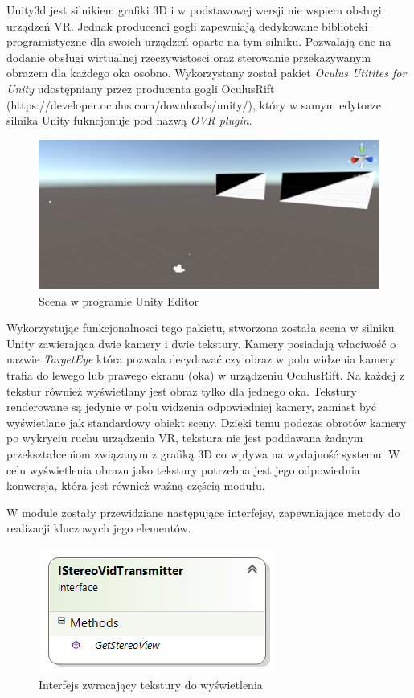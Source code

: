 \documentclass[a4paper,11pt,twoside]{report}
\theoremstyle{definition}
\begin{document}
Unity3d jest silnikiem grafiki 3D i w podstawowej wersji nie wspiera obsługi urządzeń VR. Jednak producenci gogli zapewniają dedykowane biblioteki programistyczne dla swoich urządzeń oparte na tym silniku. Pozwalają one na dodanie obsługi wirtualnej rzeczywistosci oraz sterowanie przekazywanym obrazem dla każdego oka osobno. Wykorzystany został pakiet \textit{Oculus Utitites for Unity} udostępniany przez producenta gogli OculusRift (https://developer.oculus.com/downloads/unity/), który w samym edytorze silnika Unity fukncjonuje pod nazwą \textit{OVR plugin}.  \hfill \\

\pagebreak

\begin{figure}[h]
\centering
\includegraphics[scale=0.5]{images/unityscene}
\caption[Scena Unity]{Scena w programie Unity Editor}
\end{figure}

Wykorzystując funkcjonalnosci tego pakietu, stworzona została scena w silniku Unity zawierająca dwie kamery i dwie tekstury. Kamery posiadają właciwość o nazwie \textit{TargetEye} która pozwala decydować czy obraz w polu widzenia kamery trafia do lewego lub prawego ekranu (oka) w urządzeniu OculusRift. Na każdej z tekstur również wyświetlany jest obraz tylko dla jednego oka. Tekstury renderowane są jedynie w polu widzenia odpowiedniej kamery, zamiast być wyświetlane jak standardowy obiekt sceny. Dzięki temu podczas obrotów kamery po wykryciu ruchu urządzenia VR, tekstura nie jest poddawana żadnym przekształceniom związanym z grafiką 3D  co wpływa na wydajność systemu. W celu wyświetlenia obrazu jako tekstury potrzebna jest jego odpowiednia konwersja, która jest również ważną częścią modułu.


W module zostały przewidziane następujące interfejsy, zapewniające metody do realizacji kluczowych jego elementów.

\begin{figure}[h]
\centering
\includegraphics[scale=0.9]{images/IStereoVidTransmitter}
\caption[Przekazywanie diagram]{Interfejs zwracający tekstury do wyświetlenia}
\end{figure}
\end{document}
